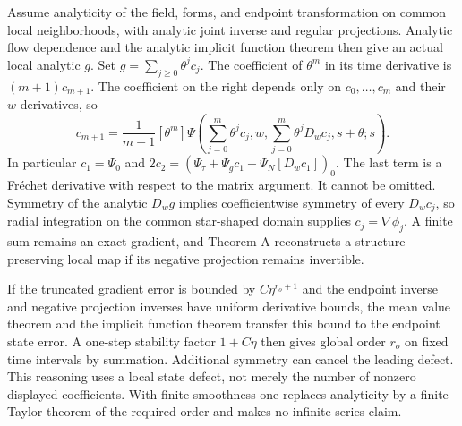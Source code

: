 Assume analyticity of the field, forms, and endpoint transformation on common local neighborhoods, with analytic joint inverse and regular projections. Analytic flow dependence and the analytic implicit function theorem then give an actual local analytic $g$. Set $g=\sum_{j\ge0}\theta^jc_j$. The coefficient of $\theta^m$ in its time derivative is $(m+1)c_{m+1}$. The coefficient on the right depends only on $c_0,\ldots,c_m$ and their $w$ derivatives, so
\begin{equation}
 c_{m+1}=\frac1{m+1}[\theta^m]\Psi\left(
 \sum_{j=0}^m\theta^jc_j,w,\sum_{j=0}^m\theta^jD_wc_j,s+\theta;s\right).
 \label{eq:sup-coefficient-recursion}
\end{equation}
In particular $c_1=\Psi_0$ and $2c_2=(\Psi_\tau+\Psi_gc_1+\Psi_N[D_wc_1])_0$. The last term is a Fr\'echet derivative with respect to the matrix argument. It cannot be omitted. Symmetry of the analytic $D_wg$ implies coefficientwise symmetry of every $D_wc_j$, so radial integration on the common star-shaped domain supplies $c_j=\nabla\phi_j$. A finite sum remains an exact gradient, and Theorem A reconstructs a structure-preserving local map if its negative projection remains invertible.

If the truncated gradient error is bounded by $C\eta^{r_o+1}$ and the endpoint inverse and negative projection inverses have uniform derivative bounds, the mean value theorem and the implicit function theorem transfer this bound to the endpoint state error. A one-step stability factor $1+C\eta$ then gives global order $r_o$ on fixed time intervals by summation. Additional symmetry can cancel the leading defect. This reasoning uses a local state defect, not merely the number of nonzero displayed coefficients. With finite smoothness one replaces analyticity by a finite Taylor theorem of the required order and makes no infinite-series claim.


